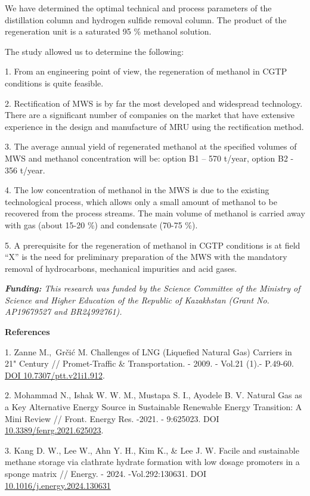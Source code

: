 We have determined the optimal technical and process parameters of the
distillation column and hydrogen sulfide removal column. The product of
the regeneration unit is a saturated 95 \% methanol solution.

The study allowed us to determine the following:

1. From an engineering point of view, the regeneration of methanol in
CGTP conditions is quite feasible.

2. Rectification of MWS is by far the most developed and widespread
technology. There are a significant number of companies on the market
that have extensive experience in the design and manufacture of MRU
using the rectification method.

3. The average annual yield of regenerated methanol at the specified
volumes of MWS and methanol concentration will be: option B1 -- 570
t/year, option B2 - 356 t/year.

4. The low concentration of methanol in the MWS is due to the existing
technological process, which allows only a small amount of methanol to
be recovered from the process streams. The main volume of methanol is
carried away with gas (about 15-20 \%) and condensate (70-75 \%).

5. A prerequisite for the regeneration of methanol in CGTP conditions is
at field ``X'' is the need for preliminary preparation of the MWS with
the mandatory removal of hydrocarbons, mechanical impurities and acid
gases.

\emph{{\bfseries Funding:} This research was funded by the Science
Committee of the Ministry of Science and Higher Education of the
Republic of Kazakhstan (Grant No. AP19679527 and BR24992761).}

{\bfseries References}

1. Zanne M.,~Grčić M. Challenges of LNG (Liquefied Natural Gas) Carriers
in 21" Century // Promet-Traffic \& Transportation. - 2009. - Vol.21
(1).- P.49-60. \href{https://doi.org/10.7307/ptt.v21i1.912}{DOI
10.7307/ptt.v21i1.912}.

2. Mohammad N., Ishak W. W. M., Mustapa S. I., Ayodele B. V. Natural Gas
as a Key Alternative Energy Source in Sustainable Renewable Energy
Transition: A Mini Review // Front. Energy Res. -2021. - 9:625023. DOI
\href{https://doi.org/10.3389/fenrg.2021.625023}{10.3389/fenrg.2021.625023}.

3. Kang D. W., Lee W., Ahn Y. H., Kim K., \& Lee J. W. Facile and
sustainable methane storage via clathrate hydrate formation with low
dosage promoters in a sponge matrix // Energy. - 2024. -Vol.292:130631.
DOI
\href{https://doi.org/10.1016/j.energy.2024.130631}{10.1016/j.energy.2024.130631}

